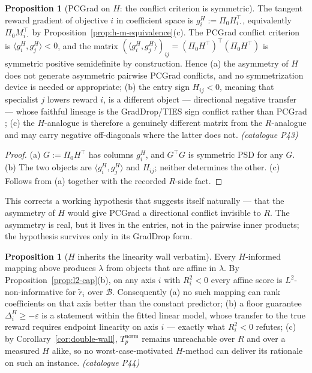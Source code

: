 \documentclass[12pt,a4paper]{report}
\newcommand{\1}{\mathbf{1}}
\newcommand{\Bset}{\mathcal{B}}
\newcommand{\Pz}{\Pi_{0}}
\theoremstyle{definition}
\newtheorem{proposition}[definition]{Proposition}
\begin{document}
\begin{proposition}[PCGrad on \(H\): the conflict criterion is symmetric]
\label{prop:pcgrad-h}
The tangent reward gradient of objective \(i\) in coefficient space is \(g_i^H:=\Pz H_{i\cdot}^\top\), equivalently \(\Pz M_{i\cdot}^\top\) by Proposition~\ref{prop:h-m-equivalence}(c). The PCGrad conflict criterion is \(\langle g_i^H,g_j^H\rangle<0\), and the matrix \((\langle g_i^H,g_j^H\rangle)_{ij}=(\Pz H^\top)^\top(\Pz H^\top)\) is symmetric positive semidefinite by construction. Hence (a) the asymmetry of \(H\) does not generate asymmetric pairwise PCGrad conflicts, and no symmetrization device is needed or appropriate; (b) the entry sign \(H_{ij}<0\), meaning that specialist \(j\) lowers reward \(i\), is a different object --- directional negative transfer --- whose faithful lineage is the GradDrop/TIES sign conflict rather than PCGrad \citep{chen2020graddrop,yadav2023ties}; (c) the \(H\)-analogue is therefore a genuinely different matrix from the \(R\)-analogue and may carry negative off-diagonals where the latter does not. \emph{(catalogue P43)}
\end{proposition}

\begin{proof}
(a) \(G:=\Pz H^\top\) has columns \(g_i^H\), and \(G^\top G\) is symmetric PSD for any \(G\). (b) The two objects are \(\langle g_i^H,g_j^H\rangle\) and \(H_{ij}\); neither determines the other. (c) Follows from (a) together with the recorded \(R\)-side fact.
\end{proof}

This corrects a working hypothesis that suggests itself naturally --- that the asymmetry of \(H\) would give PCGrad a directional conflict invisible to \(R\). The asymmetry is real, but it lives in the entries, not in the pairwise inner products; the hypothesis survives only in its GradDrop form.

\begin{proposition}[\(H\) inherits the linearity wall verbatim]
\label{prop:h-wall}
Every \(H\)-informed mapping above produces \(\lambda\) from objects that are affine in \(\lambda\). By Proposition~\ref{prop:l2-cap}(b), on any axis \(i\) with \(R^2_i<0\) every affine score is \(L^2\)-non-informative for \(\tilde r_i\) over \(\Bset\). Consequently (a) no such mapping can rank coefficients on that axis better than the constant predictor; (b) a floor guarantee \(\Delta^H_i\ge-\varepsilon\) is a statement within the fitted linear model, whose transfer to the true reward requires endpoint linearity on axis \(i\) --- exactly what \(R^2_i<0\) refutes; (c) by Corollary~\ref{cor:double-wall}, \(T_p^{\mathrm{norm}}\) remains unreachable over \(R\) and over a measured \(H\) alike, so no worst-case-motivated \(H\)-method can deliver its rationale on such an instance. \emph{(catalogue P44)}
\end{proposition}
\end{document}
